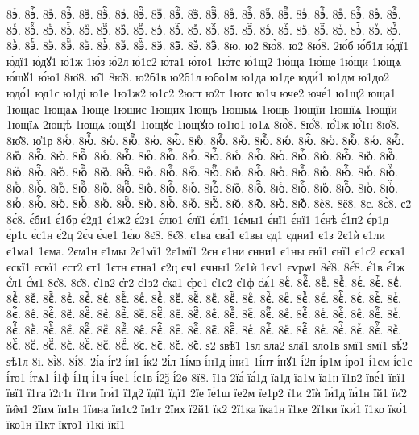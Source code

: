 {8эⷮ.
8эⷮ҇.
8эⷯ.
8эⷯ҇.
8эⷰ.
8эⷰ҇.
8эⷱ.
8эⷱ҇.
8эⷲ.
8эⷲ҇.
8эⷳ.
8эⷳ҇.
8эⷴ.
8эⷴ҇.
8эⷵ.
8эⷵ҇.
8эⷶ.
8эⷶ҇.
8эⷷ.
8эⷷ҇.
8эⷸ.
8эⷸ҇.
8эⷹ.
8эⷹ҇.
8эⷺ.
8эⷺ҇.
8эⷻ.
8эⷻ҇.
8эⷼ.
8эⷼ҇.
8эⷽ.
8эⷽ҇.
8эⷾ.
8эⷾ҇.
8эⷿ.
8эⷿ҇.
8эꙴ.
8эꙴ҇.
8эꙵ.
8эꙵ҇.
8эꙶ.
8эꙶ҇.
8эꙷ.
8эꙷ҇.
8эꙸ.
8эꙸ҇.
8эꙹ.
8эꙹ҇.
8эꙺ.
8эꙺ҇.
8эꙻ.
8эꙻ҇.
8э꙼.
8э꙼҇.
8э꙽.
8э꙽҇.
8ю.
ю2̀
8ю̀8.
ю2́
8ю́8.
2ю́б
ю́б1л
ю́дї1
ю́дї1
ю́дꙋ1
ю́1ж
1ю́з
ю́2л
ю́1с2
ю́та1
ю́то1
1ю́тс
ю́1щ2
1ю́ща
1ю́ще
1ю́щи
1ю́щѧ
ю́щꙋ1
ю́ю1
8ю̈8.
ю̑1
8ю̑8.
ю2б1в
ю2б1л
юбо1м
ю1да
ю1де
юди́1
ю1дм
ю1до2
юдо́1
юд1с
ю1ді
ю1е
1ю1ж2
ю1с2
2юст
ю2т
1ютс
ю1ч
юче2
юче́1
ю1щ2
юща1
1ющас
1ющаѧ
1юще
1ющис
1ющих
1ющъ
1ющыѧ
1ющь
1ющїи
1ющїѧ
1ющїи
1ющїѧ
2ющѣ
1ющѧ
ющꙋ1
1ющꙋс
1ющꙋю
ю1ю1
ю1ѧ
8ю҆̀8.
8ю҆́8.
ю҆́1ж
ю҆́1н
8ю҆̈8.
8ю҆̑8.
ю҆1р
8юⷠ.
8юⷠ҇.
8юⷡ.
8юⷡ҇.
8юⷢ.
8юⷢ҇.
8юⷣ.
8юⷣ҇.
8юⷤ.
8юⷤ҇.
8юⷥ.
8юⷥ҇.
8юⷦ.
8юⷦ҇.
8юⷧ.
8юⷧ҇.
8юⷨ.
8юⷨ҇.
8юⷩ.
8юⷩ҇.
8юⷪ.
8юⷪ҇.
8юⷫ.
8юⷫ҇.
8юⷬ.
8юⷬ҇.
8юⷭ.
8юⷭ҇.
8юⷮ.
8юⷮ҇.
8юⷯ.
8юⷯ҇.
8юⷰ.
8юⷰ҇.
8юⷱ.
8юⷱ҇.
8юⷲ.
8юⷲ҇.
8юⷳ.
8юⷳ҇.
8юⷴ.
8юⷴ҇.
8юⷵ.
8юⷵ҇.
8юⷶ.
8юⷶ҇.
8юⷷ.
8юⷷ҇.
8юⷸ.
8юⷸ҇.
8юⷹ.
8юⷹ҇.
8юⷺ.
8юⷺ҇.
8юⷻ.
8юⷻ҇.
8юⷼ.
8юⷼ҇.
8юⷽ.
8юⷽ҇.
8юⷾ.
8юⷾ҇.
8юⷿ.
8юⷿ҇.
8юꙴ.
8юꙴ҇.
8юꙵ.
8юꙵ҇.
8юꙶ.
8юꙶ҇.
8юꙷ.
8юꙷ҇.
8юꙸ.
8юꙸ҇.
8юꙹ.
8юꙹ҇.
8юꙺ.
8юꙺ҇.
8юꙻ.
8юꙻ҇.
8ю꙼.
8ю꙼҇.
8ю꙽.
8ю꙽҇.
8ѐ8.
8ё8.
8є.
8є̀8.
є2́
8є́8.
є́би1
є́1бр
є́2д1
є́1ж2
є́2з1
є́лю1
є́лї1
є́лї1
1є́мы1
є́нї1
є́нї1
1є́нѣ
є́1п2
є́р1д
є́р1с
є́с1н
є́2ц
2є́ч
є́че1
1є́ю
8є̈8.
8є̑8.
є1ва
єва́1
є1вы
єд1
єдни1
є1з
2є1ѝ
є1ли
є1ма1
1єма.
2єм1н
є1мы
2є1мї1
2є1мї1
2єн
є1ни
єнни1
є1ны
єнї1
єнї1
є1с2
єска1
єскї1
єскї1
єст2
єт1
1єтн
єтна1
є2ц
єч1
єчны1
2є1ѝ
1єѵ1
єѵрѡ1
8є҆̀8.
8є҆́8.
є҆́1в
є҆́1ж
є҆́л1
є҆́м1
8є҆̈8.
8є҆̑8.
є҆1в2
є҆г2
є҆1з2
є҆ка1
є҆ре1
є҆1с2
є҆1ф
є҆ѧ́1
8єⷠ.
8єⷠ҇.
8єⷡ.
8єⷡ҇.
8єⷢ.
8єⷢ҇.
8єⷣ.
8єⷣ҇.
8єⷤ.
8єⷤ҇.
8єⷥ.
8єⷥ҇.
8єⷦ.
8єⷦ҇.
8єⷧ.
8єⷧ҇.
8єⷨ.
8єⷨ҇.
8єⷩ.
8єⷩ҇.
8єⷪ.
8єⷪ҇.
8єⷫ.
8єⷫ҇.
8єⷬ.
8єⷬ҇.
8єⷭ.
8єⷭ҇.
8єⷮ.
8єⷮ҇.
8єⷯ.
8єⷯ҇.
8єⷰ.
8єⷰ҇.
8єⷱ.
8єⷱ҇.
8єⷲ.
8єⷲ҇.
8єⷳ.
8єⷳ҇.
8єⷴ.
8єⷴ҇.
8єⷵ.
8єⷵ҇.
8єⷶ.
8єⷶ҇.
8єⷷ.
8єⷷ҇.
8єⷸ.
8єⷸ҇.
8єⷹ.
8єⷹ҇.
8єⷺ.
8єⷺ҇.
8єⷻ.
8єⷻ҇.
8єⷼ.
8єⷼ҇.
8єⷽ.
8єⷽ҇.
8єⷾ.
8єⷾ҇.
8єⷿ.
8єⷿ҇.
8єꙴ.
8єꙴ҇.
8єꙵ.
8єꙵ҇.
8єꙶ.
8єꙶ҇.
8єꙷ.
8єꙷ҇.
8єꙸ.
8єꙸ҇.
8єꙹ.
8єꙹ҇.
8єꙺ.
8єꙺ҇.
8єꙻ.
8єꙻ҇.
8є꙼.
8є꙼҇.
8є꙽.
8є꙽҇.
ѕ2
ѕвѣ̑1
1ѕл
ѕла2
ѕла̑1
ѕло1в
ѕмї1
ѕмї1
ѕѣ́2
ѕѣ1л
8і.
8і̀8.
8і́8.
2і́а
і́г2
і́и1
і́к2
2і́л
1і́мв
і́н1д
і́ни1
1і́нт
і́нꙋ1
і́2п
і́р1м
і́ро1
і́1см
і́с1с
і́то1
і́тѧ1
і́1ф
і́1ц
і́1ч
і́че1
і́є1в
і́2ѯ
і́2ѳ
8ї8.
ї1а
2їа́
їа́1д
їа1д
їа1м
їа1н
ї1в2
їве́1
ївї1
ївї1
ї1га
ї2г1г
ї1ги
їги́1
ї1д2
їдї1
їдї1
2їе
їе́1ш
їе2м
їе1р2
ї1и
2їѝ
їи́1д
їи́1н
їй1
їи̑2
їи̑м1
2їим
їи1н
1їина
їи1с2
їи1т
2їих
ї2й1
їк2
2ї1ка
їка1н
ї1ке
2ї1ки
їки́1
ї1ко
їко́1
їко1н
ї1кт
їкто1
ї1кі
їкї1
}

